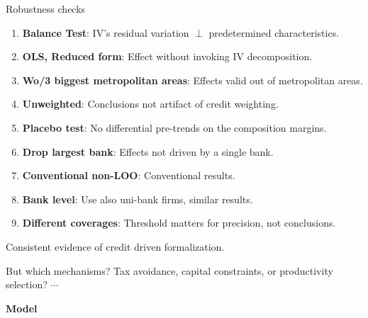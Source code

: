 \documentclass[aspectratio=169]{beamer}
\begin{document}
 
\begin{frame}{Robustness checks}\label{robustness}
 
\begin{enumerate}
    \item \textbf{Balance Test}: IV's residual variation $\perp$ predetermined characteristics. \hyperlink{balance}{}
    \item \textbf{OLS, Reduced form}: Effect without invoking IV decomposition. \hyperlink{ols}{}
    \item \textbf{Wo/3 biggest metropolitan areas}: Effects valid out of metropolitan areas. \hyperlink{womet}{}
    \item \textbf{Unweighted}: Conclusions not artifact of credit weighting. \hyperlink{unweighted}{}
    \item \textbf{Placebo test}: No differential pre-trends on the composition margins. \hyperlink{placebo}{}
    \item \textbf{Drop largest bank}: Effects not driven by a single bank. \hyperlink{dropbank}{}
    \item \textbf{Conventional non-LOO}: Conventional results. \hyperlink{nonloo}{}
    \item \textbf{Bank level}: Use also uni-bank firms, similar results. \hyperlink{banklevel}{}
    \item \textbf{Different coverages}: Threshold matters for precision, not conclusions. \hyperlink{coverage}{}
\end{enumerate}
 
\vspace{1mm}
 
\begin{center}
    \Large Consistent evidence of credit driven formalization.
\end{center}
\pause

But which mechanisms? Tax avoidance, capital constraints, or productivity selection? $\cdots$ 

\begin{center}
    \Large \textbf{Model}
\end{center}

 
\end{frame}
 
 
\end{document}
